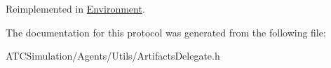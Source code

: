 \-Reimplemented in \hyperlink{interface_environment_a69d6de38803175da4f50bb45e89ac29f}{\-Environment}.



\-The documentation for this protocol was generated from the following file\-:\begin{DoxyCompactItemize}
\item 
\-A\-T\-C\-Simulation/\-Agents/\-Utils/\-Artifacts\-Delegate.\-h\end{DoxyCompactItemize}
